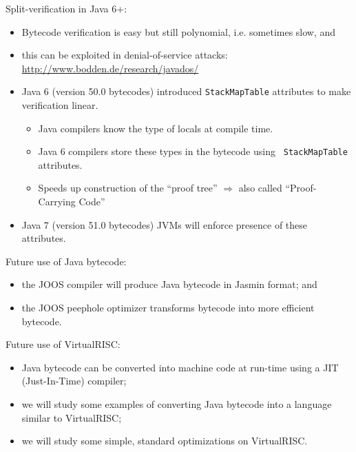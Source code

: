 \begin{slide*}
Split-verification in Java 6+:
\begin{itemize}
  \item Bytecode verification is easy but still polynomial, i.e. sometimes slow,
  and
  \item this can be exploited in denial-of-service attacks:
		\url{http://www.bodden.de/research/javados/}
  \item
	Java 6 (version 50.0 bytecodes) introduced {\tt StackMapTable} attributes to
	make verification linear.
  \begin{itemize}
    \item Java compilers know the type of locals at compile time.
    \item Java 6 compilers store these types in the bytecode using {\tt
    StackMapTable} attributes.
    \item Speeds up construction of the ``proof tree'' $\Rightarrow$ also
    called ``Proof-Carrying Code''
  \end{itemize}
  \item Java 7 (version 51.0 bytecodes) JVMs will enforce presence of these
 attributes.
\vfil
   
\end{itemize}
\end{slide*}


\begin{slide*}
Future use of Java bytecode:
\begin{itemize}
\item
the JOOS compiler will produce Java bytecode in
                   Jasmin format; and
\item the JOOS peephole optimizer transforms bytecode into
                   more efficient bytecode.
\end{itemize}

Future use of VirtualRISC:
\begin{itemize}
\item
Java bytecode can be converted into machine code
                  at run-time using a JIT (Just-In-Time) compiler;
\item
we will study some examples of converting Java bytecode
                  into a language similar to VirtualRISC;
\item
we will study some
                  simple, standard optimizations on VirtualRISC.
\end{itemize}
\vfil
\end{slide*}



